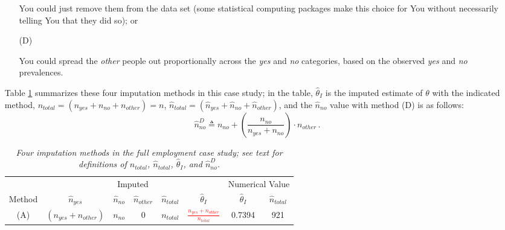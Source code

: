 \documentclass[12pt]{article}
\begin{document}
\begin{itemize}
\begin{itemize}
You could just remove them from the data set (some statistical computing packages make this choice for You without necessarily telling You that they did so); or

\item[(D)]

You could spread the \textit{other} people out proportionally across the \textit{yes} and \textit{no} categories, based on the observed \textit{yes} and \textit{no} prevalences.

\end{itemize}

Table \ref{t:imputation-1} summarizes these four imputation methods in this case study; in the table, $\hat{ \theta }_I$ is the imputed estimate of $\theta$ with the indicated method, $n_{ total } = ( n_{ yes } + n_{ no } + n_{ other } ) = n$, $\hat{ n }_{ total } = ( \hat{ n }_{ yes } + \hat{ n }_{ no } + \hat{ n }_{ other } )$, and the $\hat{ n }_{ no }$ value with method (D) is as follows:
\begin{equation} \label{e:proportional-1}
\hat{ n }_{ no }^D \triangleq n_{ no } + \left( \frac{ n_{ no } }{ n_{ yes } + n_{ no } } \right) \cdot n_{ other } \, .
\end{equation}

\begin{table}[t!]

\centering

\caption{\textit{Four imputation methods in the full employment case study; see text for definitions of $n_{ total }$, $\hat{ n }_{ total }$, $\hat{ \theta }_I$, and $\hat{ n }_{ no }^D$.}}

\label{t:imputation-1}

\bigskip

\begin{tabular}{c||ccccc||cc}

& \multicolumn{5}{c||}{Imputed} & \multicolumn{2}{c}{Numerical Value} \\ \cline{2-8}

\rule{0pt}{3ex} Method & $\hat{ n }_{ yes }$ & $\hat{ n }_{ no }$ & $\hat{ n }_{ other }$ & $\hat{ n }_{ total }$ & $\hat{ \theta }_I$ & $\hat{ \theta }_I$ & $\hat{ n }_{ total }$ \\ \hline 

\rule{0pt}{3ex} (A) & $( n_{ yes } + n_{ other } )$ & $n_{ no }$ & 0 & $n_{ total }$ & \textit{\textcolor{red}{$\frac{n_{yes} + n_{other}}{n_{total}}$}} & 0.7394 & 921 \\


\end{tabular}
\end{table}
\end{itemize}
\end{document}
